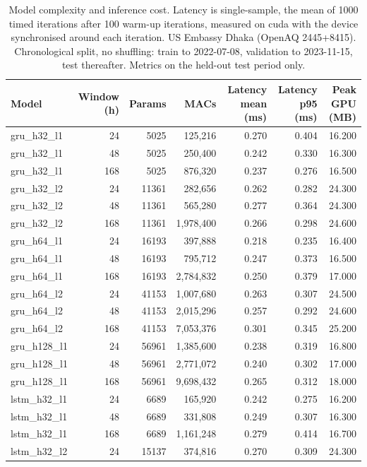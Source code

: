\begin{table}[htbp]
\caption{Model complexity and inference cost. Latency is single-sample, the mean of 1000 timed iterations after 100 warm-up iterations, measured on cuda with the device synchronised around each iteration. US Embassy Dhaka (OpenAQ 2445+8415). Chronological split, no shuffling: train to 2022-07-08, validation to 2023-11-15, test thereafter. Metrics on the held-out test period only.}
\label{tab:green_complexity}
\begin{tabular}{lrrrrrr}
\toprule
Model & Window (h) & Params & MACs & Latency mean (ms) & Latency p95 (ms) & Peak GPU (MB) \\
\midrule
gru\_h32\_l1 & 24 & 5025 & 125,216 & 0.270 & 0.404 & 16.200 \\
gru\_h32\_l1 & 48 & 5025 & 250,400 & 0.242 & 0.330 & 16.300 \\
gru\_h32\_l1 & 168 & 5025 & 876,320 & 0.237 & 0.276 & 16.500 \\
gru\_h32\_l2 & 24 & 11361 & 282,656 & 0.262 & 0.282 & 24.300 \\
gru\_h32\_l2 & 48 & 11361 & 565,280 & 0.277 & 0.364 & 24.300 \\
gru\_h32\_l2 & 168 & 11361 & 1,978,400 & 0.266 & 0.298 & 24.600 \\
gru\_h64\_l1 & 24 & 16193 & 397,888 & 0.218 & 0.235 & 16.400 \\
gru\_h64\_l1 & 48 & 16193 & 795,712 & 0.247 & 0.373 & 16.500 \\
gru\_h64\_l1 & 168 & 16193 & 2,784,832 & 0.250 & 0.379 & 17.000 \\
gru\_h64\_l2 & 24 & 41153 & 1,007,680 & 0.263 & 0.307 & 24.500 \\
gru\_h64\_l2 & 48 & 41153 & 2,015,296 & 0.257 & 0.292 & 24.600 \\
gru\_h64\_l2 & 168 & 41153 & 7,053,376 & 0.301 & 0.345 & 25.200 \\
gru\_h128\_l1 & 24 & 56961 & 1,385,600 & 0.238 & 0.319 & 16.800 \\
gru\_h128\_l1 & 48 & 56961 & 2,771,072 & 0.240 & 0.302 & 17.000 \\
gru\_h128\_l1 & 168 & 56961 & 9,698,432 & 0.265 & 0.312 & 18.000 \\
lstm\_h32\_l1 & 24 & 6689 & 165,920 & 0.242 & 0.275 & 16.200 \\
lstm\_h32\_l1 & 48 & 6689 & 331,808 & 0.249 & 0.307 & 16.300 \\
lstm\_h32\_l1 & 168 & 6689 & 1,161,248 & 0.279 & 0.414 & 16.700 \\
lstm\_h32\_l2 & 24 & 15137 & 374,816 & 0.270 & 0.309 & 24.300 \\

\end{tabular}
\end{table}
